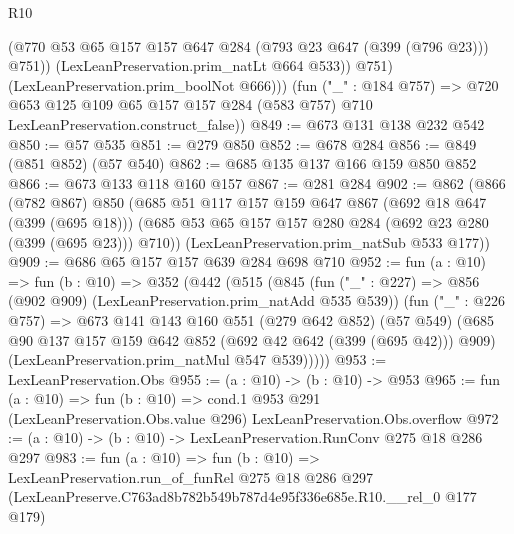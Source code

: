 \begin{lexlean}{R10}
\begin{coremodule}
                (@770 @53 @65 @157 @157 @647 @284 (@793 @23 @647 (@399 (@796 @23))) @751))
              (LexLeanPreservation.prim_natLt @664 @533))
            @751)
          (LexLeanPreservation.prim_boolNot @666)))
      (fun ("_" : @184 @757) =>
      @720 @653 @125 @109 @65 @157 @157 @284 (@583 @757) @710 LexLeanPreservation.construct_false))
@849 := @673 @131 @138 @232 @542
@850 := @57 @535
@851 := @279 @850
@852 := @678 @284
@856 := @849 (@851 @852) (@57 @540)
@862 := @685 @135 @137 @166 @159 @850 @852
@866 := @673 @133 @118 @160 @157
@867 := @281 @284
@902 := @862
    (@866
      (@782 @867)
      @850
      (@685
        @51
        @117
        @157
        @159
        @647
        @867
        (@692 @18 @647 (@399 (@695 @18)))
        (@685 @53 @65 @157 @157 @280 @284 (@692 @23 @280 (@399 (@695 @23))) @710))
      (LexLeanPreservation.prim_natSub @533 @177))
@909 := @686 @65 @157 @157 @639 @284 @698 @710
@952 := fun (a : @10) =>
  fun (b : @10) =>
  @352
    (@442
      (@515
        (@845
          (fun ("_" : @227) => @856 (@902 @909) (LexLeanPreservation.prim_natAdd @535 @539))
          (fun ("_" : @226 @757) =>
          @673
            @141
            @143
            @160
            @551
            (@279 @642 @852)
            (@57 @549)
            (@685 @90 @137 @157 @159 @642 @852 (@692 @42 @642 (@399 (@695 @42))) @909)
            (LexLeanPreservation.prim_natMul @547 @539)))))
@953 := LexLeanPreservation.Obs
@955 := (a : @10) -> (b : @10) -> @953
@965 := fun (a : @10) =>
  fun (b : @10) =>
  cond.{1} @953 @291 (LexLeanPreservation.Obs.value @296) LexLeanPreservation.Obs.overflow
@972 := (a : @10) -> (b : @10) -> LexLeanPreservation.RunConv @275 @18 @286 @297
@983 := fun (a : @10) =>
  fun (b : @10) =>
  LexLeanPreservation.run_of_funRel
    @275
    @18
    @286
    @297
    (LexLeanPreserve.C763ad8b782b549b787d4e95f336e685e.R10.__rel_0 @177 @179)
\end{coremodule}
\end{lexlean}

